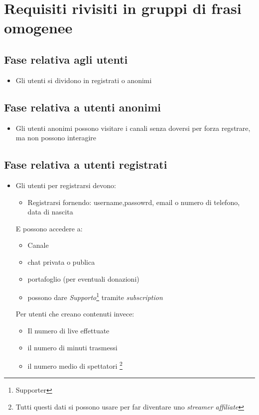 \section{Requisiti rivisiti in gruppi di frasi omogenee}
\subsection{Fase relativa agli utenti}
\begin{itemize}
  \item Gli utenti si dividono in registrati o anonimi
\end{itemize}
\subsection{Fase relativa a utenti anonimi}
\begin{itemize}
  \item Gli utenti anonimi possono visitare i canali senza doversi per 
  forza regstrare, ma non possono interagire 
\end{itemize}
\subsection{Fase relativa a utenti registrati}
\begin{itemize}
  \item Gli utenti per registrarsi devono:
  \begin{itemize}
    \item Registrarsi fornendo: username,passowrd, email o numero di telefono, data di nascita
  \end{itemize}
  E possono accedere a:
    \begin{itemize}
      \item Canale 
      \item chat privata o publica
      \item portafoglio (per eventuali donazioni)
      \item possono dare \textit{Supporto}\footnote{Supporter} tramite \textit{subscription}
    \end{itemize} 
  Per utenti che creano contenuti invece:
    \begin{itemize}
      \item Il numero di live effettuate 
      \item il numero di minuti trasmessi
      \item il numero medio di spettatori \footnote{Tutti questi dati si possono usare per far diventare uno \textit{streamer affiliate}} %
    \end{itemize}
\end{itemize}
